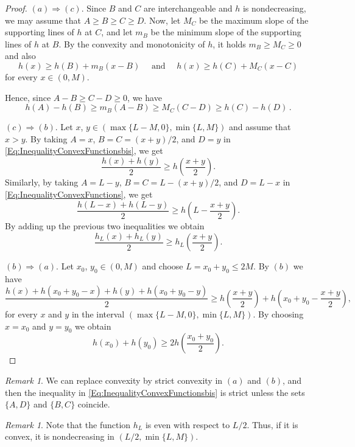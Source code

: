\documentclass[12pt,reqno]{amsart}
\theoremstyle{definition}
\theoremstyle{remark}
\newtheorem{remark}[theorem]{Remark}
\numberwithin{equation}{section}
\begin{document}
	\begin{proof}
		$(a)\Rightarrow (c)$.	Since $B$ and $C$ are interchangeable and $h$ is nondecreasing, we may assume that $A \geq B \geq C \geq D$. Now, let $M_C$ be the maximum slope of the supporting lines of $h$ at $C$, and let $m_B$ be the minimum slope of the supporting lines of $h$ at $B$. By the convexity and monotonicity of $h$, it holds $m_B \geq M_C\geq 0$ and also
		$$
		h(x) \geq h(B) + m_B (x-B) \quad \text{ and } \quad h(x) \geq h(C) + M_C (x-C) 
		$$
		for every $x \in (0,M)$.
		
		Hence, since $A-B \geq C-D\geq 0$, we have
		$$
		h(A)-h(B) \geq m_B(A-B) \geq M_C (C-D) \geq h(C) - h(D)\,.
		$$
		
		$(c) \Rightarrow (b)$. Let $x$, $y\in (\max \{L-M,0\}, \min \{L,M\})$ and assume that $x>y$. By taking $A=x$, $B=C=(x+y)/2$, and $D = y$ in \eqref{Eq:InequalityConvexFunctionsbis}, we get 
		$$
		\dfrac{h(x) + h(y)}{2} \geq h \left( \dfrac{x+y}{2}\right). 
		$$ 
		Similarly, by taking $A= L-y$, $B=C=L -(x+y)/2$, and $D = L-x$ in \eqref{Eq:InequalityConvexFunctions}, we get 
		$$
		\dfrac{h(L-x) + h(L-y)}{2} \geq h \left(L - \dfrac{x+y}{2}\right). 
		$$
		By adding up the previous two inequalities we obtain
		$$
		\dfrac{h_L(x) + h_L(y)}{2} \geq h_L \left( \dfrac{x+y}{2}\right). 
		$$ 
		
		$(b) \Rightarrow (a)$. Let $x_0$, $y_0 \in (0,M)$ and choose $L = x_0 + y_0 \leq 2M$. By $(b)$ we have 
		$$
		\dfrac{h(x) + h(x_0 + y_0-x) + h(y) + h(x_0 + y_0-y)}{2} \geq h \left( \dfrac{x+y}{2}\right) + h \left(x_0 + y_0 - \dfrac{x+y}{2}\right),
		$$
		for every $x$ and $y$ in the interval $(\max \{L-M,0\}, \min \{L,M\})$. By choosing $x=x_0$ and $y=y_0$ we obtain
		$$
		h(x_0) + h(y_0)\geq 2 h \left( \dfrac{x_0+y_0}{2}\right). 
		$$
	\end{proof}
	
	
	\begin{remark}
		\label{Remark:StrictConvexity}
		We can replace convexity by strict convexity in $(a)$ and $(b)$, and then the inequality in \eqref{Eq:InequalityConvexFunctionsbis} is strict unless the sets $\{A,D\}$ and $\{B,C\}$ coincide.
	\end{remark}
	
	\begin{remark}
		\label{Remark:h_Lincreasing}
		Note that the function $h_L$ is even with respect to $L/2$. Thus, if it is convex, it is nondecreasing in $(L/2, \min \{L,M\})$.
	\end{remark}
	
\end{document}
